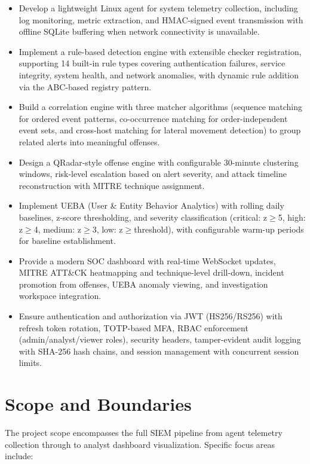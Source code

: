 \begin{itemize}
    \item Develop a lightweight Linux agent for system telemetry collection, including log monitoring, metric extraction, and HMAC-signed event transmission with offline SQLite buffering when network connectivity is unavailable.
    \item Implement a rule-based detection engine with extensible checker registration, supporting 14 built-in rule types covering authentication failures, service integrity, system health, and network anomalies, with dynamic rule addition via the ABC-based registry pattern.
    \item Build a correlation engine with three matcher algorithms (sequence matching for ordered event patterns, co-occurrence matching for order-independent event sets, and cross-host matching for lateral movement detection) to group related alerts into meaningful offenses.
    \item Design a QRadar-style offense engine with configurable 30-minute clustering windows, risk-level escalation based on alert severity, and attack timeline reconstruction with MITRE technique assignment.
    \item Implement UEBA (User \& Entity Behavior Analytics) with rolling daily baselines, z-score thresholding, and severity classification (critical: z$\geq$5, high: z$\geq$4, medium: z$\geq$3, low: z$\geq$threshold), with configurable warm-up periods for baseline establishment.
    \item Provide a modern SOC dashboard with real-time WebSocket updates, MITRE ATT\&CK heatmapping and technique-level drill-down, incident promotion from offenses, UEBA anomaly viewing, and investigation workspace integration.
    \item Ensure authentication and authorization via JWT (HS256/RS256) with refresh token rotation, TOTP-based MFA, RBAC enforcement (admin/analyst/viewer roles), security headers, tamper-evident audit logging with SHA-256 hash chains, and session management with concurrent session limits.
\end{itemize}

\section{Scope and Boundaries}

The project scope encompasses the full SIEM pipeline from agent telemetry collection through to analyst dashboard visualization. Specific focus areas include:

